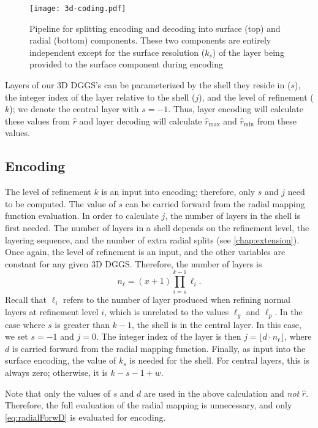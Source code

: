 \begin{figure}[htp!]
	\centering
	\texttt{[image: 3d-coding.pdf]}
	\caption[Pipeline for encoding and decoding with the grid extension method]{
		Pipeline for splitting encoding and decoding into surface (top) and radial (bottom) components.
		These two components are entirely independent except for the surface resolution ($k_s$) of the layer being provided to the surface component during encoding
	}
	\label{fig:prismatoid-coding}
\end{figure}


Layers of our 3D DGGS's can be parameterized by the shell they reside in ($s$), the integer index of the layer relative to the shell ($j$), and the level of refinement ($k$); we denote the central layer with $s = -1$.
Thus, layer encoding will calculate these values from $\hat{r}$ and layer decoding will calculate $\hat{r}_\mathrm{max}$ and $\hat{r}_\mathrm{min}$ from these values.


\subsection{Encoding}
The level of refinement $k$ is an input into encoding; therefore, only $s$ and $j$ need to be computed.
The value of $s$ can be carried forward from the radial mapping function evaluation.
In order to calculate $j$, the number of layers in the shell is first needed.
The number of layers in a shell depends on the refinement level, the layering sequence, and the number of extra radial splits (see \cref{chap:extension}).
Once again, the level of refinement is an input, and the other variables are constant for any given 3D DGGS.
Therefore, the number of layers is
%
\begin{equation*}
n_\ell = \left( x+1 \right) \prod_{i = s}^{k - 1} \ell_i.
\end{equation*}
%
Recall that $\ell_i$ refers to the number of layer produced when refining normal layers at refinement level $i$, which is unrelated to the values $\ell_g$ and $\ell_p$.
In the case where $s$ is greater than $k-1$, the shell is in the central layer.
In this case, we set $s = -1$ and $j = 0$.
The integer index of the layer is then $j = \lfloor d \cdot n_\ell \rfloor$, where $d$ is carried forward from the radial mapping function.
Finally, as input into the surface encoding, the value of $k_s$ is needed for the shell.
For central layers, this is always zero; otherwise, it is $k - s - 1 + w$.


Note that only the values of $s$ and $d$ are used in the above calculation and \textit{not} $\hat{r}$.
Therefore, the full evaluation of the radial mapping is unnecessary, and only \cref{eq:radialForwD} is evaluated for encoding.


